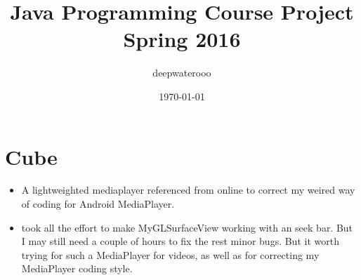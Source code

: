 \documentclass[9pt,b5paper]{article}
\author{deepwaterooo}
\date{\today}
\title{Java Programming Course Project Spring 2016}
\begin{document}
\maketitle
\tableofcontents


\section{Cube}
\label{sec-1}
\begin{itemize}
\item A lightweighted mediaplayer referenced from online to correct my weired way of coding for Android MediaPlayer.
\item took all the effort to make MyGLSurfaceView working with an seek bar. But I may still need a couple of hours to fix the rest minor bugs. But it worth trying for such a MediaPlayer for videos, as well as for correcting my MediaPlayer coding style.


\end{itemize}
\end{document}
